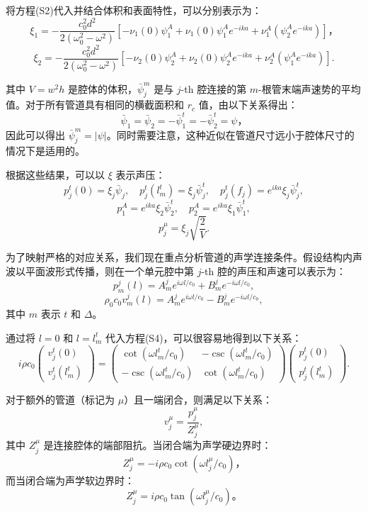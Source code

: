 将方程(S2)代入并结合体积和表面特性，可以分别表示为：
\[
\xi_1 = -\frac{c_0^2 d^2}{2(\omega_0^2 - \omega^2)} \left[ -\nu_1(0) \psi_1^A + \nu_1(0) \psi_1^A e^{-ika} + \nu_1^A(\psi_2^A e^{-ika}) \right]，
\]
\[
\xi_2 = -\frac{c_0^2 d^2}{2(\omega_0^2 - \omega^2)} \left[ -\nu_2(0) \psi_2^A + \nu_2(0) \psi_2^A e^{-ika} + \nu_2^A(\psi_1^A e^{-ika}) \right]. 
\]

其中 \( V = w^2 h \) 是腔体的体积，\( \bar{\psi}_j^m \) 是与 \( j \)-th 腔连接的第 \( m \)-根管末端声速势的平均值。对于所有管道具有相同的横截面积和 \( r_c \) 值，由以下关系得出：
\[
\bar{\psi}_1 = \bar{\psi}_2 = -\bar{\psi}_1^t = -\bar{\psi}_2^t = \psi，
\]
因此可以得出 \( \bar{\psi}_j^m = |\psi| \)。同时需要注意，这种近似在管道尺寸远小于腔体尺寸的情况下是适用的。

根据这些结果，可以以 \( \xi \) 表示声压：
\[
p_j^t(0) = \xi_j \bar{\psi}_j, \quad
p_j^t(l_m^t) = \xi_j \bar{\psi}_j^t, \quad
p_j^t(f_j) = e^{ika} \xi_j \bar{\psi}_j^t,
\]
\[
p_1^A = e^{ika} \xi_2 \bar{\psi}_2^t, \quad
p_2^A = e^{ika} \xi_1 \bar{\psi}_1^t,
\]
\[
p_j^\mu = \xi_j \sqrt{\frac{2}{V}}. 
\]

为了映射严格的对应关系，我们现在重点分析管道的声学连接条件。假设结构内声波以平面波形式传播，则在一个单元腔中第 \( j \)-th 腔的声压和声速可以表示为：
\[
p_m^j(l) = A_m^j e^{i\omega l/c_0} + B_m^j e^{-i\omega l/c_0},
\]
\[
\rho_0 c_0 v_m^j(l) = A_m^j e^{i\omega l/c_0} - B_m^j e^{-i\omega l/c_0}, 
\]
其中 \( m \) 表示 \( t \) 和 \( \Delta \)。

通过将 \( l = 0 \) 和 \( l = l_m^t \) 代入方程(S4)，可以很容易地得到以下关系：
\[
i\rho c_0
\begin{pmatrix}
v_j^t(0) \\
v_j^t(l_m^t)
\end{pmatrix}
=
\begin{pmatrix}
\cot(\omega l_m^t / c_0) & -\csc(\omega l_m^t / c_0) \\
-\csc(\omega l_m^t / c_0) & \cot(\omega l_m^t / c_0)
\end{pmatrix}
\begin{pmatrix}
p_j^t(0) \\
p_j^t(l_m^t)
\end{pmatrix}. 
\]

对于额外的管道（标记为 \( \mu \)）且一端闭合，则满足以下关系：
\[
v_j^\mu = \frac{p_j^\mu}{Z_j^\mu},
\]
其中 \( Z_j^\mu \) 是连接腔体的端部阻抗。当闭合端为声学硬边界时：
\[
Z_j^\mu = -i\rho c_0 \cot(\omega l_j^\mu / c_0)，
\]
而当闭合端为声学软边界时：
\[
Z_j^\mu = i\rho c_0 \tan(\omega l_j^\mu / c_0)。
\]

